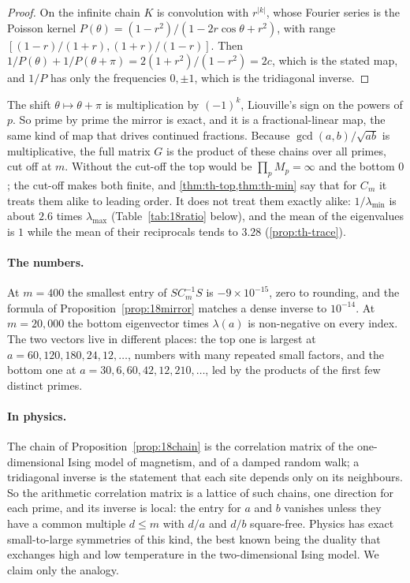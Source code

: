 \begin{proof}
On the infinite chain $K$ is convolution with $r^{|k|}$, whose Fourier series is the Poisson kernel
$P(\theta)=(1-r^{2})/(1-2r\cos\theta+r^{2})$, with range $[(1-r)/(1+r),(1+r)/(1-r)]$. Then
$1/P(\theta)+1/P(\theta+\pi)=2(1+r^{2})/(1-r^{2})=2c$, which is the stated map, and $1/P$ has only the
frequencies $0,\pm1$, which is the tridiagonal inverse.
\end{proof}

The shift $\theta\mapsto\theta+\pi$ is multiplication by $(-1)^{k}$, Liouville's sign on the powers of
$p$. So prime by prime the mirror is exact, and it is a fractional-linear map, the same kind of map that
drives continued fractions. Because $\gcd(a,b)/\sqrt{ab}$ is multiplicative, the full matrix $G$ is the product of these chains over
all primes, cut off at $m$. Without the cut-off the top would be $\prod_pM_p=\infty$ and the bottom $0$;
the cut-off makes both finite, and \cref{thm:th-top,thm:th-min} say that for $C_m$ it treats them alike to
leading order. It does not treat them exactly alike: $1/\lambda_{\min}$ is about $2.6$ times $\lambda_{\max}$
(Table~\ref{tab:18ratio} below), and the mean of the eigenvalues is $1$ while the mean of their reciprocals
tends to $3.28$ (\cref{prop:th-trace}).

\paragraph{The numbers.} At $m=400$ the smallest entry of $SC_m^{-1}S$ is $-9\times10^{-15}$, zero to
rounding, and the formula of Proposition~\ref{prop:18mirror} matches a dense inverse to $10^{-14}$. At
$m=20{,}000$ the bottom eigenvector times $\lambda(a)$ is non-negative on every index. The two vectors
live in different places: the top one is largest at $a=60,120,180,24,12,\ldots$, numbers with many
repeated small factors, and the bottom one at $a=30,6,60,42,12,210,\ldots$, led by the products of the
first few distinct primes.

\paragraph{In physics.} The chain of Proposition~\ref{prop:18chain} is the correlation matrix of the
one-dimensional Ising model of magnetism, and of a damped random walk; a tridiagonal inverse is the
statement that each site depends only on its neighbours. So the arithmetic correlation matrix is a
lattice of such chains, one direction for each prime, and its inverse is local: the entry for $a$ and $b$
vanishes unless they have a common multiple $d\le m$ with $d/a$ and $d/b$ square-free. Physics has exact
small-to-large symmetries of this kind, the best known being the duality that exchanges high and low
temperature in the two-dimensional Ising model. We claim only the analogy.

